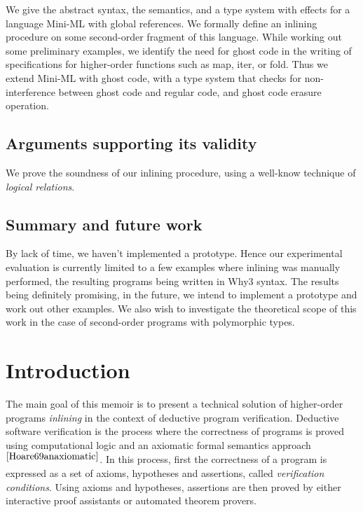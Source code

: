 \documentclass[a4paper,11pt,oneside]{article}
\theoremstyle{plain}
\begin{document}
We give the abstract syntax, the semantics, and a type system
with effects for a language Mini-ML with global references. We
formally define an inlining procedure on some second-order fragment
of this language. While working out some preliminary examples,
we identify the need for ghost code in
the writing of specifications for higher-order functions such as map,
iter, or fold. Thus we extend Mini-ML with ghost code, with a
type system that checks for non-interference between ghost code and
regular code, and ghost code erasure operation.

\subsection*{Arguments supporting its validity}

We prove the soundness of our inlining procedure, using a well-know
technique of \textit{logical relations}.

\subsection*{Summary and future work}

By lack of time, we haven't implemented a prototype. Hence our
experimental evaluation is currently limited to a few examples where
inlining was manually performed, the resulting programs being written
in Why3 syntax. The results being definitely promising, in the future,
we intend to implement a prototype and work out other examples.
We also wish to investigate the theoretical scope of this work in the
case of second-order programs with polymorphic types.
\newpage
\tableofcontents
\newpage
\section{Introduction}

	The main goal of this memoir is to present a technical solution of higher-order programs \textit{inlining} in the context of deductive program verification. 
	Deductive software verification is the process where the correctness
of programs is proved using computational logic and an axiomatic formal semantics approach$^{\cite{Hoare69anaxiomatic}}$.
	In this process, first the correctness of a program is expressed
as a set of axioms, hypotheses and assertions, called \textit{verification conditions}.
	Using axioms and hypotheses, assertions are then proved
by either interactive proof assistants or automated theorem provers. \\
\end{document}
